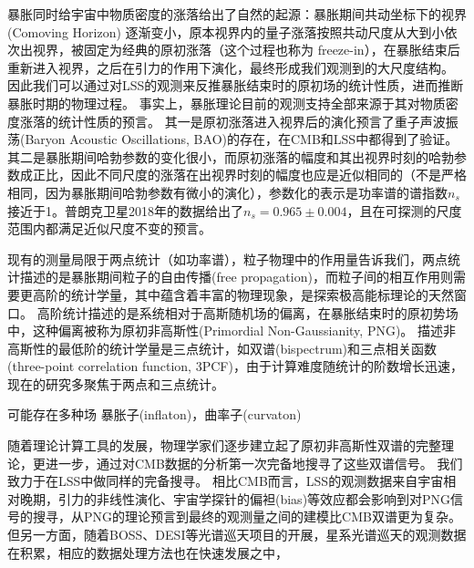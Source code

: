 暴胀同时给宇宙中物质密度的涨落给出了自然的起源：暴胀期间共动坐标下的视界 (Comoving Horizon) 逐渐变小，原本视界内的量子涨落按照共动尺度从大到小依次出视界，被固定为经典的原初涨落（这个过程也称为 freeze-in），在暴胀结束后重新进入视界，之后在引力的作用下演化，最终形成我们观测到的大尺度结构。
因此我们可以通过对LSS的观测来反推暴胀结束时的原初场的统计性质，进而推断暴胀时期的物理过程。
事实上，暴胀理论目前的观测支持全部来源于其对物质密度涨落的统计性质的预言。
其一是原初涨落进入视界后的演化预言了重子声波振荡(Baryon Acoustic Oscillations, BAO)的存在，在CMB和LSS中都得到了验证。
其二是暴胀期间哈勃参数的变化很小，而原初涨落的幅度和其出视界时刻的哈勃参数成正比，因此不同尺度的涨落在出视界时刻的幅度也应是近似相同的（不是严格相同，因为暴胀期间哈勃参数有微小的演化），参数化的表示是功率谱的谱指数$n_s$接近于1。普朗克卫星2018年的数据给出了$n_s=0.965\pm0.004$\cite{planck18}，且在可探测的尺度范围内都满足近似尺度不变的预言。

现有的测量局限于两点统计（如功率谱），粒子物理中的作用量告诉我们，两点统计描述的是暴胀期间粒子的自由传播(free propagation)，而粒子间的相互作用则需要更高阶的统计学量，其中蕴含着丰富的物理现象，是探索极高能标理论的天然窗口。
高阶统计描述的是系统相对于高斯随机场的偏离，在暴胀结束时的原初势场中，这种偏离被称为原初非高斯性(Primordial Non-Gaussianity, PNG)。
描述非高斯性的最低阶的统计学量是三点统计，如双谱(bispectrum)和三点相关函数(three-point correlation function, 3PCF)，由于计算难度随统计的阶数增长迅速，现在的研究多聚焦于两点和三点统计。



可能存在多种场 暴胀子(inflaton)，曲率子(curvaton)


随着理论计算工具的发展，物理学家们逐步建立起了原初非高斯性双谱的完整理论，更进一步，\cite{sohn2024CCCMB}通过对CMB数据的分析第一次完备地搜寻了这些双谱信号。
我们致力于在LSS中做同样的完备搜寻。
相比CMB而言，LSS的观测数据来自宇宙相对晚期，引力的非线性演化、宇宙学探针的偏袒(bias)等效应都会影响到对PNG信号的搜寻，从PNG的理论预言到最终的观测量之间的建模比CMB双谱更为复杂。
但另一方面，随着BOSS、DESI等光谱巡天项目的开展，星系光谱巡天的观测数据在积累，相应的数据处理方法也在快速发展之中，


